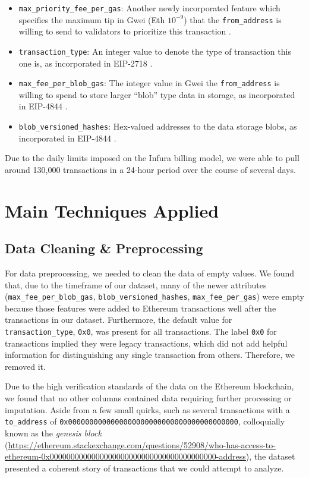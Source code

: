 \documentclass[sigconf]{acmart}
\begin{document}
\begin{itemize}
    \item \texttt{max\_priority\_fee\_per\_gas}: Another newly incorporated feature which specifies the maximum tip in Gwei (Eth $10^{-9}$) that the \texttt{from\_address} is willing to send to validators to prioritize this transaction \cite{LondonHardfork}.
    \item \texttt{transaction\_type}: An integer value to denote the type of transaction this one is, as incorporated in EIP-2718 \cite{LondonHardfork}.
    \item \texttt{max\_fee\_per\_blob\_gas}: The integer value in Gwei the \texttt{from\_address} is willing to spend to store larger “blob” type data in storage, as incorporated in EIP-4844 \cite{ProtoDanksharding}.
    \item \texttt{blob\_versioned\_hashes}: Hex-valued addresses to the data storage blobs, as incorporated in EIP-4844 \cite{ProtoDanksharding}.
\end{itemize}

Due to the daily limits imposed on the Infura billing model, we were able to pull around 130,000 transactions in a 24-hour period over the course of several days.  

\section{Main Techniques Applied}


\subsection{Data Cleaning \& Preprocessing}
For data preprocessing, we needed to clean the data of empty values. We found that, due to the timeframe of our dataset, many of the newer attributes (\texttt{max\_fee\_per\_blob\_gas}, \texttt{blob\_versioned\_hashes}, \texttt{max\_fee\_per\_gas}) were empty because those features were added to Ethereum transactions well after the transactions in our dataset. Furthermore, the default value for \texttt{transaction\_type}, \texttt{0x0}, was present for all transactions. The label \texttt{0x0} for transactions implied they were legacy transactions, which did not add helpful information for distinguishing any single transaction from others. Therefore, we removed it.

Due to the high verification standards of the data on the Ethereum blockchain, we found that no other columns contained data requiring further processing or imputation. Aside from a few small quirks, such as several transactions with a \texttt{to\_address} of \texttt{0x0000000000000000000000000000000000000000}, colloquially known as the \textit{genesis block} (\url{https://ethereum.stackexchange.com/questions/52908/who-has-access-to-ethereum-0x0000000000000000000000000000000000000000-address}), the dataset presented a coherent story of transactions that we could attempt to analyze.
\end{document}
